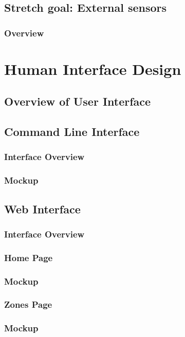 \documentclass[onecolumn, draftclsnofoot,10pt, compsoc]{IEEEtran}
\begin{document}
		\subsection{Stretch goal: External sensors}
			\subsubsection{Overview}

	\section{Human Interface Design}
		\subsection{Overview of User Interface}
		\subsection{Command Line Interface}
			\subsubsection{Interface Overview}
			\subsubsection{Mockup}
		\subsection{Web Interface}
			\subsubsection{Interface Overview}
			\subsubsection{Home Page}
			\subsubsection{Mockup}
			\subsubsection{Zones Page}
			\subsubsection{Mockup}
\end{document}

